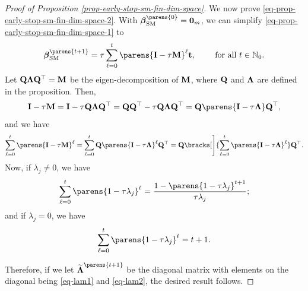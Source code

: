 \begin{proof}[Proof of Proposition \ref{prop-early-stop-sm-fin-dim-space}]
	We now prove \eqref{eq-prop-early-stop-sm-fin-dim-space-2}. With $\bbeta_{\SM}^{\parens{0}} = \boldzero_m$, we can simplify \eqref{eq-prop-early-stop-sm-fin-dim-space-1} to 
\begin{align*}%
	\bbeta_{\SM}^{\parens{t+1}} = \tau \sum_{\ell=0}^{t} \parens{\bI - \tau \bM}^{\ell} \bt, \qquad \text{ for all } t \in \Natural_0. 
\end{align*}
	Let $\mathbf{Q} \boldsymbol{\Lambda} \mathbf{Q}^\top = \mathbf{M}$ be the eigen-decomposition of $\mathbf{M}$, where $\mathbf{Q}$ and $\boldsymbol{\Lambda}$ are defined in the proposition. Then, 
\begin{align*}
	\bI - \tau \bM = \bI - \tau \bQ \bLambda \bQ^\top = \bQ \bQ^\top - \tau \bQ \bLambda \bQ^\top = \bQ \parens{\bI - \tau \bLambda} \bQ^\top, 
\end{align*}
and we have 
\begin{align*}
	\sum_{\ell=0}^{t} \parens{\bI - \tau \bM}^{\ell} = \sum_{\ell=0}^{t} \bQ \parens{\bI - \tau \bLambda}^{\ell} \bQ^\top = \bQ \bracks[\Bigg]{\sum_{\ell=0}^{t} \parens{\bI - \tau \bLambda}^{\ell}} \bQ^\top. 
\end{align*}
Now, if $\lambda_j \neq 0$, we have 
\begin{align}\label{eq-lam1}
	\sum_{\ell=0}^{t} \parens{1 - \tau \lambda_j}^{\ell} = \frac{1 - \parens{1 - \tau \lambda_j}^{t+1}}{\tau \lambda_j}; 
\end{align}
and if $\lambda_j = 0$, we have 
\begin{align}\label{eq-lam2}
	\sum_{\ell=0}^{t} \parens{1 - \tau \lambda_j}^{\ell} = t + 1. 
\end{align}

Therefore, if we let $\widetilde{\bLambda}^{\parens{t+1}}$ be the diagonal matrix with elements on the diagonal being \eqref{eq-lam1} and \eqref{eq-lam2}, the desired result follows. 
\end{proof}
